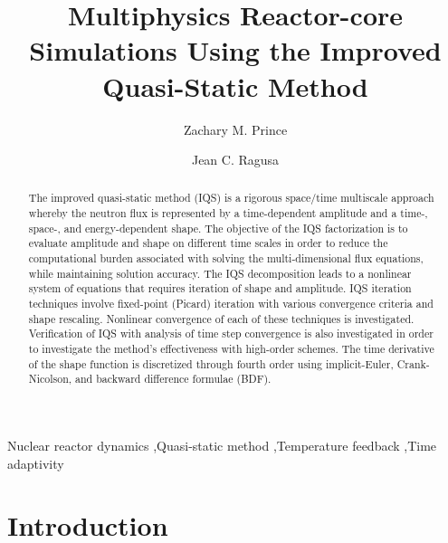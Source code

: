 \documentclass{elsarticle}
\begin{document}
\begin{frontmatter}


\title{Multiphysics Reactor-core Simulations Using the Improved Quasi-Static Method}


\author[tamu]{Zachary M. Prince}

\author[tamu]{Jean C. Ragusa}

\address[tamu]{Texas A\&M University,
  Department of Nuclear Engineering,
  College Station, TX 77840, USA}

\begin{abstract}
The improved quasi-static method (IQS) is a rigorous space/time multiscale approach whereby the neutron flux is represented by a time-dependent amplitude and a time-, space-, and energy-dependent shape. The objective of the IQS factorization is to evaluate amplitude and shape on different time scales in order to reduce the computational burden associated with solving the multi-dimensional flux equations, while maintaining solution accuracy. The IQS decomposition leads to a nonlinear system of equations that requires iteration of shape and amplitude. IQS iteration techniques involve fixed-point (Picard) iteration with various convergence criteria and shape rescaling. Nonlinear convergence of each of these techniques is investigated. Verification of IQS with analysis of time step convergence is also investigated in order to investigate the method's effectiveness with high-order schemes. The time derivative of the shape function is discretized through fourth order using implicit-Euler, Crank-Nicolson, and backward difference formulae (BDF).
\end{abstract}

\begin{keyword}
Nuclear reactor dynamics \sep Quasi-static method \sep Temperature feedback \sep Time adaptivity 
\end{keyword}

\end{frontmatter}


\section{Introduction}
\end{document}
